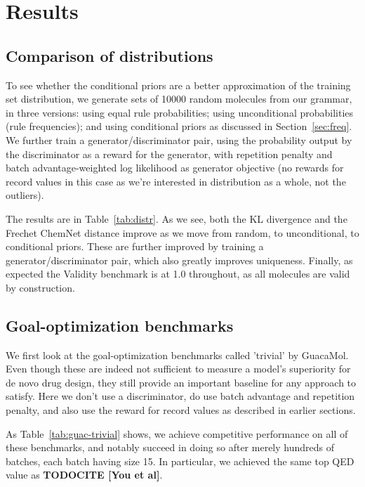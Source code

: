 \documentclass{article}
\newcommand{\CITE}[1]{{\bf TODOCITE [#1]}}
\begin{document}
\section{Results}\label{sec:results}
\subsection{Comparison of distributions}
To see whether the conditional priors are a better approximation of the training set distribution, we generate sets of 10000 random molecules from our grammar, in three versions: using equal rule probabilities; using unconditional probabilities (rule frequencies); and using conditional priors as discussed in Section~\ref{sec:freq}. We further train a generator/discriminator pair, using the probability output by the discriminator as a reward for the generator, with repetition penalty and batch advantage-weighted log likelihood as generator objective (no rewards for record values in this case as we're interested in distribution as a whole, not the outliers). 

The results are in Table~\ref{tab:distr}. As we see, both the KL divergence and the Frechet ChemNet distance improve as we move from random, to unconditional, to conditional priors. These are further improved by training a generator/discriminator pair, which also greatly improves uniqueness. Finally, as expected the Validity benchmark is at 1.0 throughout, as all molecules are valid by construction.

\subsection{Goal-optimization benchmarks}
We first look at the goal-optimization benchmarks called 'trivial' by GuacaMol. Even though these are indeed not sufficient to measure a model's superiority for de novo drug design, they still provide an important baseline for any approach to satisfy. 
Here we don't use a discriminator, do use batch advantage and repetition penalty, and also use the reward for record values as described in earlier sections.

As Table~\ref{tab:guac-trivial} shows, we achieve competitive performance on all of these benchmarks, and notably succeed in doing so after merely hundreds of batches, each batch having size 15. In particular, we achieved the same top QED value as \CITE{You et al}. 
\end{document}
